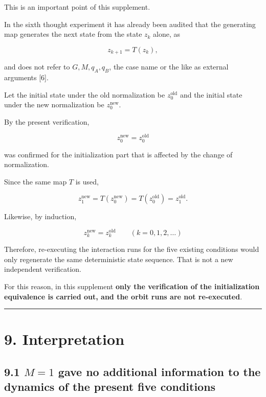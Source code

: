 \documentclass[
  a4paper,
]{article}
\begin{document}
This is an important point of this supplement.

In the sixth thought experiment it has already been audited that the
generating map generates the next state from the state \(z_k\) alone, as

\[
z_{k+1}=T(z_k),
\]

and does not refer to \(G,M,q_A,q_B\), the case name or the like as
external arguments {[}6{]}.

Let the initial state under the old normalization be
\(z_0^{\mathrm{old}}\) and the initial state under the new normalization
be \(z_0^{\mathrm{new}}\).

By the present verification,

\[
\boxed{
z_0^{\mathrm{new}}=z_0^{\mathrm{old}}
}
\]

was confirmed for the initialization part that is affected by the change
of normalization.

Since the same map \(T\) is used,

\[
z_1^{\mathrm{new}}
=T(z_0^{\mathrm{new}})
=T(z_0^{\mathrm{old}})
=z_1^{\mathrm{old}}.
\]

Likewise, by induction,

\[
\boxed{
z_k^{\mathrm{new}}=z_k^{\mathrm{old}}
\qquad (k=0,1,2,\ldots)
}
\]

Therefore, re-executing the interaction runs for the five existing
conditions would only regenerate the same deterministic state sequence.
That is not a new independent verification.

For this reason, in this supplement \textbf{only the verification of the
initialization equivalence is carried out, and the orbit runs are not
re-executed}.

\begin{center}\rule{0.5\linewidth}{0.5pt}\end{center}

\section{9. Interpretation}\label{interpretation}

\subsection{\texorpdfstring{9.1 \(M=1\) gave no additional information
to the dynamics of the present five
conditions}{9.1 M=1 gave no additional information to the dynamics of the present five conditions}}\label{m1-gave-no-additional-information-to-the-dynamics-of-the-present-five-conditions}
\end{document}
